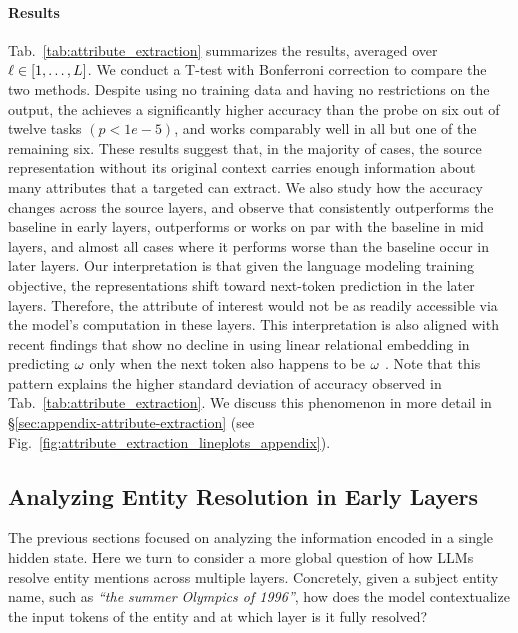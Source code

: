 \documentclass{article}
\theoremstyle{plain}
\theoremstyle{definition}
\theoremstyle{remark}
\begin{document}
\paragraph{Results} Tab.~\ref{tab:attribute_extraction} summarizes the results, averaged over $\ell \in [1, \ldots, L]$. We conduct a T-test with Bonferroni correction to compare the two methods. Despite using no training data and having no restrictions on the output, the \methodName{} achieves a significantly higher accuracy than the probe on six out of twelve tasks $(p\!<\!1e\!-\!5)$, and works comparably well in all but one of the remaining six. These results suggest that, in the majority of cases, the source representation without its original context carries enough information about many attributes that a targeted \methodName{} can extract.
We also study how the accuracy changes across the source layers, and observe that \methodName{} consistently outperforms the baseline in early layers, outperforms or works on par with the baseline in mid layers, and almost all cases where it performs worse than the baseline occur in later layers. Our interpretation is that given the language modeling training objective, the representations shift toward next-token prediction in the later layers. Therefore, the attribute of interest would not be as readily accessible via the model's computation in these layers. This interpretation is also aligned with recent findings that show no decline in using linear relational embedding in predicting $\omega$ only when the next token also happens to be $\omega$ \cite{hernandez2023linearity}. Note that this pattern explains the higher standard deviation of \methodName{} accuracy observed in Tab.~\ref{tab:attribute_extraction}. We discuss this phenomenon in more detail in \S\ref{sec:appendix-attribute-extraction} (see Fig.~\ref{fig:attribute_extraction_lineplots_appendix}).


\subsection{Analyzing Entity Resolution in Early Layers}
\label{sec:input_processing}

The previous sections focused on analyzing the information encoded in a single hidden state. Here we turn to consider a more global question of how LLMs resolve entity mentions across multiple layers. Concretely, given a subject entity name, such as \textit{``the summer Olympics of 1996''}, how does the model contextualize the input tokens of the entity and at which layer is it fully resolved?
\end{document}
